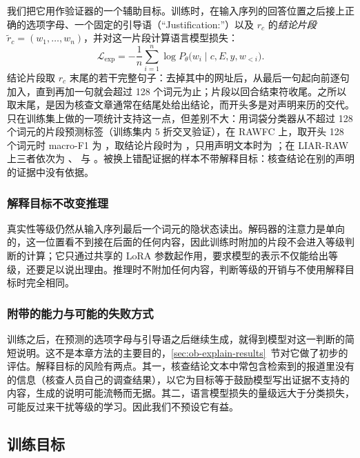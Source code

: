 我们把它用作验证器的一个辅助目标。训练时，在输入序列的回答位置之后接上正确的选项字母、一个固定的引导语（“Justification:”）以及 $r_c$ 的\emph{结论片段} $\tilde r_c=(w_1,\dots,w_n)$，并对这一片段计算语言模型损失：
\begin{equation}
\mathcal L_{\mathrm{exp}}=-\frac{1}{n}\sum_{i=1}^{n}\log P_\theta\big(w_i\mid c,E,y,w_{<i}\big).
\end{equation}
结论片段取 $r_c$ 末尾的若干完整句子：去掉其中的网址后，从最后一句起向前逐句加入，直到再加一句就会超过 128 个词元为止；片段以回合结束符收尾。之所以取末尾，是因为核查文章通常在结尾处给出结论，而开头多是对声明来历的交代。只在训练集上做的一项统计支持这一点，但差别不大：用词袋分类器从不超过 128 个词元的片段预测标签（训练集内 5 折交叉验证），在 RAWFC 上，取开头 128 个词元时 macro-F1 为 ，取结论片段时为 ，只用声明文本时为 ；在 LIAR-RAW 上三者依次为 、 与 。被换上错配证据的样本不带解释目标：核查结论在别的声明的证据中没有依据。

\subsubsection{解释目标不改变推理}
真实性等级仍然从输入序列最后一个词元的隐状态读出。解码器的注意力是单向的，这一位置看不到接在后面的任何内容，因此训练时附加的片段不会进入等级判断的计算；它只通过共享的 LoRA 参数起作用，要求模型的表示不仅能给出等级，还要足以说出理由。推理时不附加任何内容，判断等级的开销与不使用解释目标时完全相同。

\subsubsection{附带的能力与可能的失败方式}
训练之后，在预测的选项字母与引导语之后继续生成，就得到模型对这一判断的简短说明。这不是本章方法的主要目的，\ref{sec:ob-explain-results}~节对它做了初步的评估。解释目标的风险有两点。其一，核查结论文本中常包含检索到的报道里没有的信息（核查人员自己的调查结果），以它为目标等于鼓励模型写出证据不支持的内容，生成的说明可能流畅而无据。其二，语言模型损失的量级远大于分类损失，可能反过来干扰等级的学习。因此我们不预设它有益。

\subsection{训练目标}\label{sec:ob-objective}

